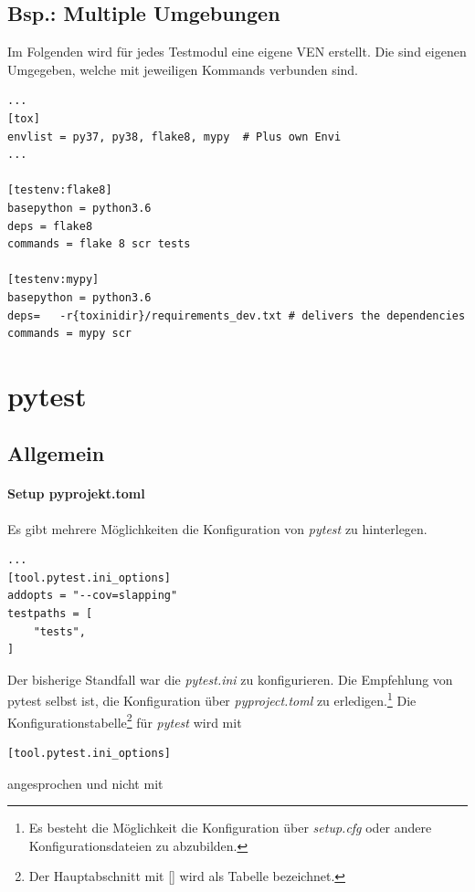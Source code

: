 \subsection{Bsp.: Multiple Umgebungen}
Im Folgenden wird für jedes Testmodul eine eigene \gls{VEN} erstellt.
Die sind eigenen Umgegeben, welche mit jeweiligen Kommands verbunden sind. 

\begin{lstlisting}[style=Config, caption={Own Env}, captionpos=b]
...
[tox]
envlist = py37, py38, flake8, mypy	# Plus own Envi
...

[testenv:flake8]
basepython = python3.6
deps = flake8
commands = flake 8 scr tests

[testenv:mypy]
basepython = python3.6
deps=	-r{toxinidir}/requirements_dev.txt # delivers the dependencies
commands = mypy scr
\end{lstlisting}

\section{pytest}
\subsection{Allgemein}
\paragraph{Setup pyprojekt.toml} \label{par:Setup pyprojekt.toml} 
Es gibt mehrere Möglichkeiten die Konfiguration von \textit{pytest} zu hinterlegen. 

\begin{lstlisting}[style=Config, caption={Beispiel pyproject.toml; Slapping pytest config}, captionpos=b]
...
[tool.pytest.ini_options]
addopts = "--cov=slapping"
testpaths = [
	"tests",
]
\end{lstlisting}


Der bisherige Standfall war die \textit{pytest.ini} zu konfigurieren. Die Empfehlung von pytest selbst ist, die Konfiguration über \textit{pyproject.toml} zu erledigen.\footnote{
	Es besteht die Möglichkeit die Konfiguration über \textit{setup.cfg} oder andere Konfigurationsdateien zu abzubilden.
}
Die Konfigurationstabelle\footnote{
	Der Hauptabschnitt mit [] wird als Tabelle bezeichnet.
}
für \textit{pytest} wird mit 

\begin{lstlisting}[style=Config, caption={zu verwenden}, captionpos=b]
[tool.pytest.ini_options]
\end{lstlisting}
angesprochen und nicht mit 

